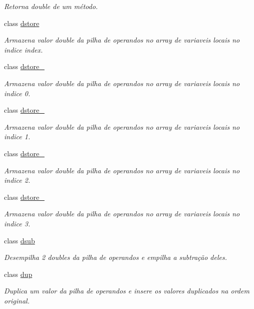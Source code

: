 \begin{DoxyCompactItemize}
\begin{DoxyCompactList}\small\item\em Retorna double de um método. \end{DoxyCompactList}\item 
class \hyperlink{class_instruction_impl_1_1dstore}{dstore}
\begin{DoxyCompactList}\small\item\em Armazena valor double da pilha de operandos no array de variaveis locais no indice index. \end{DoxyCompactList}\item 
class \hyperlink{class_instruction_impl_1_1dstore__0}{dstore\+\_}
\begin{DoxyCompactList}\small\item\em Armazena valor double da pilha de operandos no array de variaveis locais no indice 0. \end{DoxyCompactList}\item 
class \hyperlink{class_instruction_impl_1_1dstore__1}{dstore\+\_}
\begin{DoxyCompactList}\small\item\em Armazena valor double da pilha de operandos no array de variaveis locais no indice 1. \end{DoxyCompactList}\item 
class \hyperlink{class_instruction_impl_1_1dstore__2}{dstore\+\_}
\begin{DoxyCompactList}\small\item\em Armazena valor double da pilha de operandos no array de variaveis locais no indice 2. \end{DoxyCompactList}\item 
class \hyperlink{class_instruction_impl_1_1dstore__3}{dstore\+\_}
\begin{DoxyCompactList}\small\item\em Armazena valor double da pilha de operandos no array de variaveis locais no indice 3. \end{DoxyCompactList}\item 
class \hyperlink{class_instruction_impl_1_1dsub}{dsub}
\begin{DoxyCompactList}\small\item\em Desempilha 2 doubles da pilha de operandos e empilha a subtração deles. \end{DoxyCompactList}\item 
class \hyperlink{class_instruction_impl_1_1dup}{dup}
\begin{DoxyCompactList}\small\item\em Duplica um valor da pilha de operandos e insere os valores duplicados na ordem original. \end{DoxyCompactList}\item 

\end{DoxyCompactItemize}

